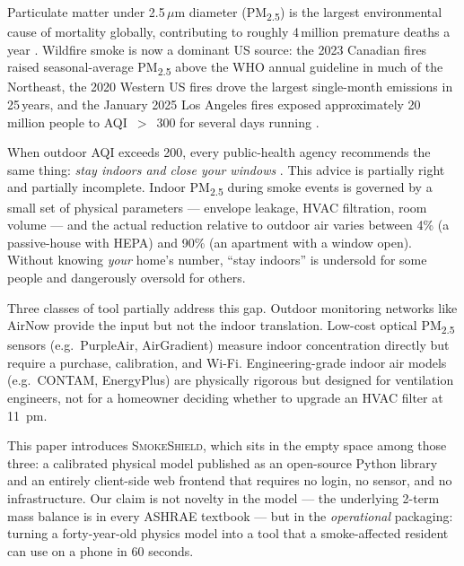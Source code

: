 \documentclass[10pt,twocolumn]{article}
\begin{document}
Particulate matter under 2.5\,$\mu$m diameter (PM\textsubscript{2.5})
is the largest environmental cause of mortality globally, contributing
to roughly 4\,million premature deaths a year
\citep{burnett2018gemm,gbd2019pm}.  Wildfire smoke is now a dominant
US source: the 2023 Canadian fires raised seasonal-average
PM\textsubscript{2.5} above the WHO annual guideline in much of the
Northeast, the 2020 Western US fires drove the largest single-month
emissions in 25\,years, and the January 2025 Los Angeles fires
exposed approximately 20\,million people to AQI~$>$~300 for several
days running \citep{xu2023canadawildfire,burke2023wildfire}.

When outdoor AQI exceeds 200, every public-health agency recommends
the same thing: \emph{stay indoors and close your windows}
\citep{rajagopalan2020indoor}.  This advice is partially right and
partially incomplete.  Indoor PM\textsubscript{2.5} during smoke
events is governed by a small set of physical parameters --- envelope
leakage, HVAC filtration, room volume --- and the actual reduction
relative to outdoor air varies between 4\% (a passive-house with HEPA)
and 90\% (an apartment with a window open).  Without knowing
\emph{your} home's number, ``stay indoors'' is undersold for some
people and dangerously oversold for others.

Three classes of tool partially address this gap.  Outdoor monitoring
networks like AirNow provide the input but not the indoor translation.
Low-cost optical PM\textsubscript{2.5} sensors (e.g.\ PurpleAir,
AirGradient) measure indoor concentration directly but require a
purchase, calibration, and Wi-Fi.  Engineering-grade indoor air models
(e.g.\ CONTAM, EnergyPlus) are physically rigorous but designed for
ventilation engineers, not for a homeowner deciding whether to upgrade
an HVAC filter at 11~pm.

This paper introduces \textsc{SmokeShield}, which sits in the empty
space among those three: a calibrated physical model published as an
open-source Python library and an entirely client-side web frontend
that requires no login, no sensor, and no infrastructure.  Our claim
is not novelty in the model --- the underlying 2-term mass balance is
in every ASHRAE textbook --- but in the
\emph{operational} packaging: turning a forty-year-old physics model
into a tool that a smoke-affected resident can use on a phone in 60
seconds.
\end{document}
